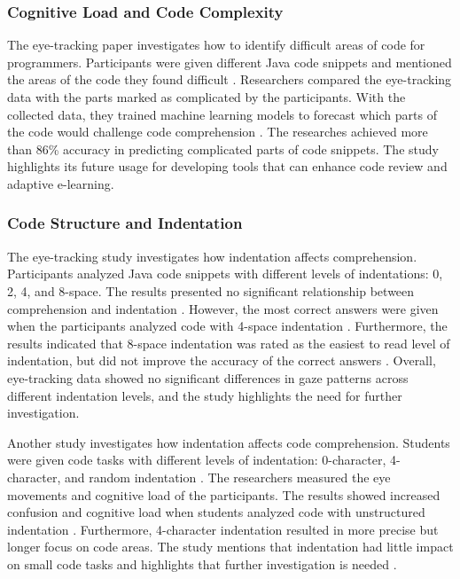 \subsubsection{Cognitive Load and Code Complexity} 

The eye-tracking paper \citet{abbad2022estimating} investigates how to identify difficult areas of code for programmers.  Participants were given different Java code snippets and mentioned the areas of the code they found difficult \citet{abbad2022estimating}. Researchers compared the eye-tracking data with the parts marked as complicated by the participants. With the collected data, they trained machine learning models to forecast which parts of the code would challenge code comprehension \citet{abbad2022estimating}. The researches achieved more than 86\% accuracy in predicting complicated parts of code snippets. The study highlights its future usage for developing tools that can enhance code review and adaptive e-learning. 



\subsubsection{Code Structure and Indentation} 


The eye-tracking study \citet{bauer2017indentations} investigates how indentation affects comprehension. Participants analyzed Java code snippets with different levels of indentations: 0, 2, 4, and 8-space. The results presented no significant relationship between comprehension and indentation \citet{bauer2017indentations}. However, the most correct answers were given when the participants analyzed code with 4-space indentation . Furthermore, the results indicated that 8-space indentation was rated as the easiest to read level of indentation, but did not improve the accuracy of the correct answers \citet{bauer2017indentations}. Overall, eye-tracking data showed no significant differences in gaze patterns across different indentation levels, and the study highlights the need for further investigation. 



Another study \citet{yorimoto2024quantitative} investigates how indentation affects code comprehension. Students were given code tasks with different levels of indentation: 0-character, 4-character, and random indentation \citet{yorimoto2024quantitative}. The researchers measured the eye movements and cognitive load of the participants. The results showed increased confusion and cognitive load when students analyzed code with unstructured indentation \citet{yorimoto2024quantitative}. Furthermore, 4-character indentation resulted in more precise but longer focus on code areas. The study mentions that indentation had little impact on small code tasks and highlights that further investigation is needed \citet{yorimoto2024quantitative}.   
